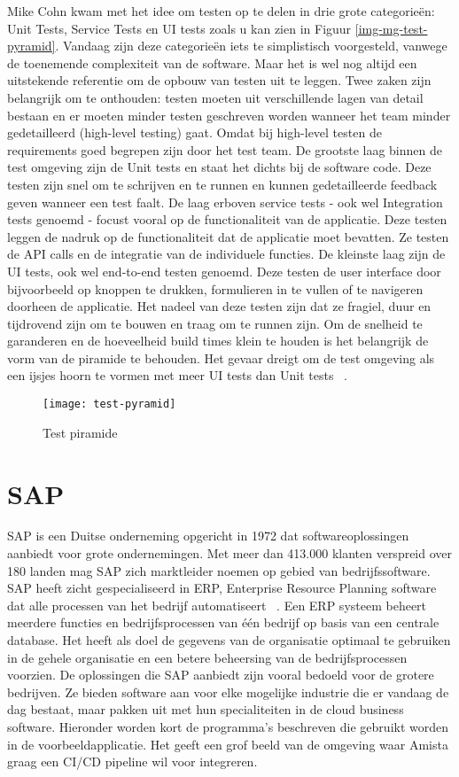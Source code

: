    Mike Cohn kwam met het idee om testen op te delen in drie grote categorieën: Unit Tests, Service Tests en UI tests zoals u kan zien in Figuur \ref{img-mg-test-pyramid}.
    Vandaag zijn deze categorieën iets te simplistisch voorgesteld, vanwege de toenemende complexiteit van de software. Maar het is wel nog altijd een uitstekende referentie om de opbouw van testen uit te leggen.
    Twee zaken zijn belangrijk om te onthouden: testen moeten uit verschillende lagen van detail bestaan en er moeten minder testen geschreven worden wanneer het team minder gedetailleerd (high-level testing) gaat. Omdat bij high-level testen de requirements goed begrepen zijn door het test team.
    De grootste laag binnen de test omgeving zijn de Unit tests en staat het dichts bij de software code. Deze testen zijn snel om te schrijven en te runnen en kunnen gedetailleerde feedback geven wanneer een test faalt.
    De laag erboven service tests - ook wel Integration tests genoemd - focust vooral op de functionaliteit van de applicatie.
    Deze testen leggen de nadruk op de functionaliteit dat de applicatie moet bevatten. Ze testen de API calls en de integratie van de individuele functies.
    De kleinste laag zijn de UI tests, ook wel end-to-end testen genoemd. Deze testen de user interface door bijvoorbeeld op knoppen te drukken, formulieren in te vullen of te navigeren doorheen de applicatie. Het nadeel van deze testen zijn dat ze fragiel, duur en tijdrovend zijn om te bouwen en traag om te runnen zijn.
    Om de snelheid te garanderen en de hoeveelheid build times klein te houden is het belangrijk de vorm van de piramide te behouden. Het gevaar dreigt om de test omgeving als een ijsjes hoorn te vormen met meer UI tests dan Unit tests ~\autocite{Fowler2012}.
    \begin{figure}	
        \texttt{[image: test-pyramid]}
        \caption{Test piramide ~\autocite{Vocke2018}} \label{img-test-pyramid}
    \end{figure}

\section{SAP}
\label{sec:sap}
    SAP is een Duitse onderneming opgericht in 1972 dat softwareoplossingen aanbiedt voor grote ondernemingen. Met meer dan 413.000 klanten verspreid over 180 landen mag SAP zich marktleider noemen op gebied van bedrijfssoftware.
    SAP heeft zicht gespecialiseerd in ERP, Enterprise Resource Planning software dat alle processen van het bedrijf automatiseert ~\autocite{SAPERP2019}. Een ERP systeem beheert meerdere functies en bedrijfsprocessen van één bedrijf op basis van een centrale database. Het heeft als doel de gegevens van de organisatie optimaal te gebruiken in de gehele organisatie en een betere beheersing van de bedrijfsprocessen voorzien.
    De oplossingen die SAP aanbiedt zijn vooral bedoeld voor de grotere bedrijven. Ze bieden software aan voor elke mogelijke industrie die er vandaag de dag bestaat, maar pakken uit met hun specialiteiten in de cloud business software.
    Hieronder worden kort de programma's beschreven die gebruikt worden in de voorbeeldapplicatie. Het geeft een grof beeld van de omgeving waar Amista graag een CI/CD pipeline wil voor integreren.
     
